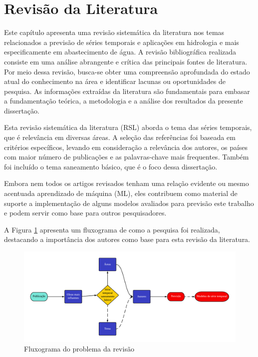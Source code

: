 \section{Revis\~ao da Literatura}\label{sec:refteo}


Este capítulo apresenta uma revisão sistemática  da literatura nos temas relacionados a previsão de séries temporais e aplicações em hidrologia e mais especificamente em abastecimento de água. A revisão bibliográfica realizada consiste em uma análise abrangente e crítica das principais fontes de literatura. Por meio dessa revisão, busca-se obter uma compreensão aprofundada do estado atual do conhecimento na área e identificar lacunas ou oportunidades de pesquisa. As informações extraídas da literatura são fundamentais para embasar a fundamentação teórica, a metodologia e a análise dos resultados da presente dissertação.

Esta revisão sistemática da literatura (RSL) aborda o tema das séries temporais, que é relevância em diversas áreas. A seleção das referências foi baseada em critérios específicos, levando em consideração a relevância dos autores, os países com maior número de publicações e as palavras-chave mais frequentes. Também foi incluído o tema saneamento básico, que é o foco dessa dissertação.

Embora nem todos os artigos revisados tenham uma relação evidente ou mesmo acentuada aprendizado de máquina (ML), eles contribuem como material de suporte a implementação de alguns modelos avaliados para previsão este trabalho e podem servir como base para outros pesquisadores.

A Figura \ref{fig:serie-temporal} apresenta um fluxograma de como a pesquisa foi realizada, destacando a importância dos autores como base para esta revisão da literatura. 

\begin{figure}[!htb]
	\centering
	\caption{Fluxograma do problema da revisão}
	\label{fig:serie-temporal}
	\includegraphics[width=\linewidth]{Revisao/Figuras/serie_temporal}
	
	
\end{figure}

